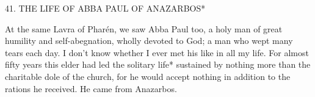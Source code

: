41. THE LIFE OF ABBA PAUL OF ANAZARBOS*

At the same Lavra of Pharén, we saw Abba Paul too, a holy man
of great humility and self-abegnation, wholly devoted to God; a
man who wept many tears each day. I don't know whether I ever
met his like in all my life. For almost fifty years this elder had led
the solitary life* sustained by nothing more than the charitable dole
of the church, for he would accept nothing in addition to the rations
he received. He came from Anazarbos.

